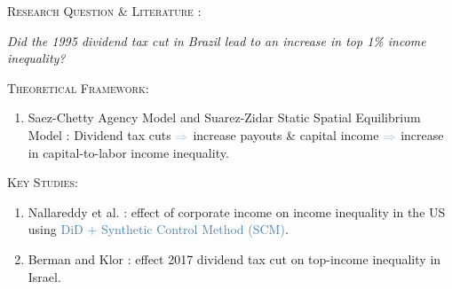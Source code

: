 \documentclass[11pt,aspectratio=169]{beamer}
\begin{document}
\begin{frame}{\textsc{Research Question \& Literature :}}

  \begin{center}
   \textit{Did the 1995 \textcolor{primaryred}{dividend tax cut} in Brazil lead to an increase in \textcolor{primaryred}{top 1\% income inequality}?}
  \end{center}
  \medskip
  \textsc{\color{harmonizedblue}Theoretical Framework:}
  \begin{enumerate}
    \item \textcolor{primaryred}{Saez-Chetty Agency Model} \cite{chetty_agency_2007} and \textcolor{primaryred}{Suarez-Zidar Static Spatial Equilibrium Model} \cite{suarezetzidar}: Dividend tax cuts ${\color{steelblue}\Rightarrow}$  increase payouts \& capital income ${\color{steelblue}\Rightarrow}$  increase in capital-to-labor income inequality.   
  \end{enumerate}  
  \medskip
  \textsc{\color{harmonizedblue}Key Studies:}
    \begin{enumerate}
      \item \textcolor{primaryred}{Nallareddy et al.} \cite{nallareddy2021corporate}: \textcolor{harmonizedblue}{effect of corporate income on income inequality} in the US using \textcolor{steelblue}{DiD + Synthetic Control Method (SCM)}.
      \item \textcolor{primaryred}{Berman and Klor} \cite{berman2024capital}: \textcolor{harmonizedblue}{effect 2017 dividend tax cut on top-income inequality} in Israel.
    \end{enumerate}
\end{frame}
\end{document}
